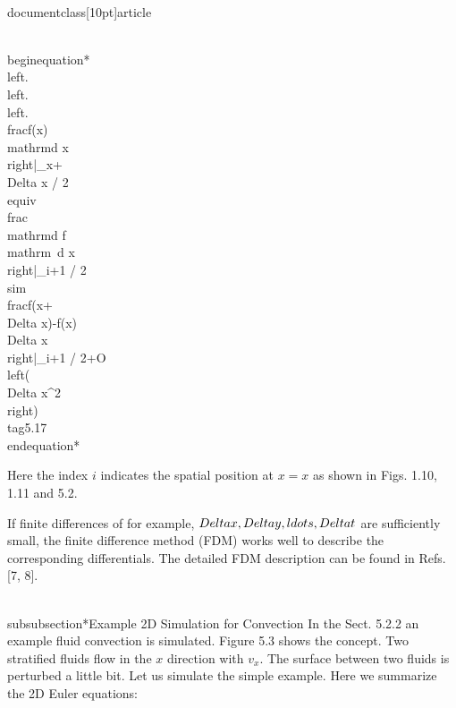 \\documentclass[10pt]{article}
\begin{document}
\\begin{equation*}
\\left.\\left.\\left.\\frac{f(x)}{\\mathrm{d} x}\\right|_{x+\\Delta x / 2} \\equiv \\frac{\\mathrm{d} f}{\\mathrm{~d} x}\\right|_{i+1 / 2} \\sim \\frac{f(x+\\Delta x)-f(x)}{\\Delta x}\\right|_{i+1 / 2}+O\\left(\\Delta x^{2}\\right) \\tag{5.17}
\\end{equation*}


Here the index $i$ indicates the spatial position at $x=x$ as shown in Figs. 1.10, 1.11 and 5.2.

If finite differences of for example, $\\Delta x, \\Delta y, \\ldots, \\Delta t$ are sufficiently small, the finite difference method (FDM) works well to describe the corresponding differentials. The detailed FDM description can be found in Refs. [7, 8].

\\subsubsection*{Example 2D Simulation for Convection}
In the Sect. 5.2.2 an example fluid convection is simulated. Figure 5.3 shows the concept. Two stratified fluids flow in the $x$ direction with $v_{x}$. The surface between two fluids is perturbed a little bit. Let us simulate the simple example. Here we summarize the 2D Euler equations:
\end{document}
